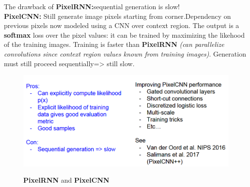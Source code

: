 \documentclass[11pt]{article}
\begin{document}
\clearpage
The drawback of \textbf{PixelRNN:}sequential generation is slow!\\
\textbf{PixelCNN:} Still generate image pixels starting from corner.Dependency on previous pixels now modeled using a CNN over context region. The output is a \textbf{softmax} loss over the pixel values: it can be trained by maximizing the likehood of the training images.
Training is faster than \textbf{PixelRNN} \textit{(can parallelize convolutions since context region values known from training images)}. Generation must still proceed sequentially=> still slow.
\begin{figure}[h]
\centering
\captionsetup{justification=centering}
\includegraphics[width=0.6\linewidth]{L1214.pdf}
\label{fig:L1214}
\caption{\textbf{PixelRNN} and \textbf{PixelCNN}}
\end{figure}
\end{document}
